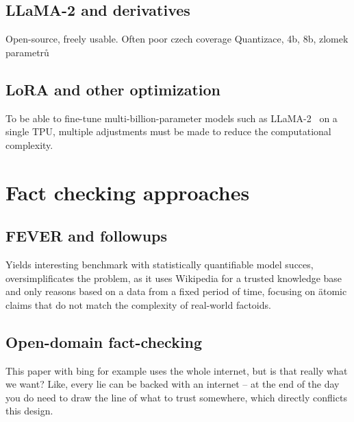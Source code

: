 \subsection{LLaMA-2 and derivatives}
\label{sec:llama}
Open-source, freely usable.
Often poor czech coverage 
Quantizace, 4b, 8b, zlomek parametrů\cite{openassistant}

\subsection{LoRA and other optimization}
To be able to fine-tune multi-billion-parameter models such as \textsf{LLaMA-2}~\cite{llama2} on a single TPU, multiple adjustments must be made to reduce the computational complexity.~\cite{peft}
\cite{lora}

\section{Fact checking approaches}
\subsection{FEVER and followups}
Yields interesting benchmark with statistically quantifiable model succes, oversimplificates the problem, as it uses Wikipedia for a trusted knowledge base and only reasons based on a data from a fixed period of time, focusing on \"{atomic} claims that do not match the complexity of real-world factoids.
\subsection{Open-domain fact-checking}
This paper with bing for example uses the whole internet, but is that really what we want? Like, every lie can be backed with an internet -- at the end of the day you do need to draw the line of what to trust somewhere, which directly conflicts this design.


